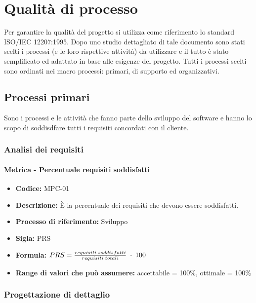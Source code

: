 \section{Qualità di processo}
Per garantire la qualità del progetto si utilizza come riferimento lo standard ISO/IEC 12207:1995. Dopo uno studio dettagliato di tale documento sono stati scelti i processi (e le loro rispettive attività) da 
utilizzare e il tutto è stato semplificato ed adattato in base alle esigenze del progetto. Tutti i processi scelti sono ordinati nei macro processi: primari, di supporto ed organizzativi. 

\subsection{Processi primari}
Sono i processi e le attività che fanno parte dello sviluppo del software e hanno lo scopo di soddisdfare tutti i requisiti concordati con il cliente.

\subsubsection{Analisi dei requisiti}
    \paragraph{Metrica - Percentuale requisiti soddisfatti}
    \begin{itemize}
        \item \textbf{Codice:} MPC-01
        \item \textbf{Descrizione:} È la percentuale dei requisiti che devono essere soddisfatti.
        \item \textbf{Processo di riferimento:} Sviluppo
        \item \textbf{Sigla:} PRS
        \item \textbf{Formula:} \begin{math}{PRS = {requisiti \; soddisfatti \over requisiti \; totali}\; \cdot \; 100}\end{math}
        \item \textbf{Range di valori che può assumere:} accettabile = 100\%, ottimale = 100\% 
    \end{itemize}

\subsubsection{Progettazione di dettaglio}

